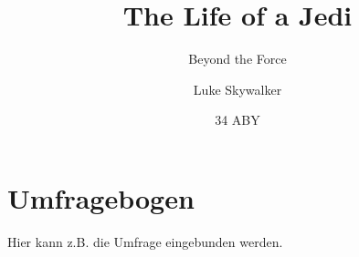 \documentclass{vwa}
\title{The Life of a Jedi}
\subtitle{Beyond the Force}
\author{Luke Skywalker}
\date{34 ABY} %
\begin{document}
\mymaketitle

\tableofcontents





\listoffigures



\appendix

\chapter{Umfragebogen}
\label{apx:survey}
Hier kann z.B. die Umfrage eingebunden werden.
% 
\end{document}

